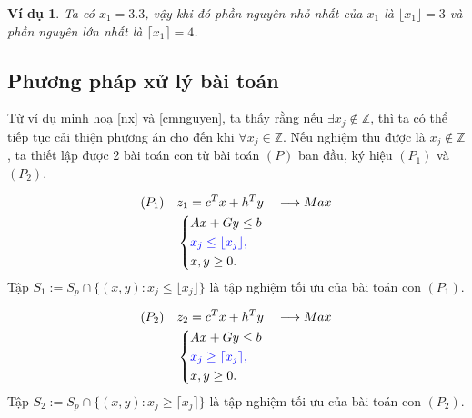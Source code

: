 \documentclass[12pt,a4paper]{report}
\newtheorem{vd}{Ví dụ}
\begin{document}
\begin{vd}
Ta có $x_1=3.3$, vậy khi đó phần nguyên nhỏ nhất của $x_1$ là $\lfloor x_1 \rfloor = 3$ và phần nguyên lớn nhất là $\lceil x_1 \rceil =4$.
\end{vd}

\subsection*{Phương pháp xử lý bài toán}

Từ ví dụ minh hoạ \eqref{nx} và \eqref{cmnguyen}, ta thấy rằng nếu $\exists x_j \notin \mathbb{Z}$, thì ta có thể tiếp tục cải thiện phương án cho đến khi $\forall x_j \in \mathbb{Z}$. 
Nếu nghiệm thu được là $x_j \notin \mathbb{Z}$, ta thiết lập được 2 bài toán con từ bài toán $(P)$ ban đầu, ký hiệu $(P_1)$ và $(P_2)$.

\begin{equation}
    \begin{split}
    (P_1) \quad & z_1=c^Tx+h^Ty \quad \longrightarrow Max \\
                & \left\{\begin{split}
                    &Ax+Gy \leq  b \\
                    &\color{blue} x_j \leq \lfloor x_j \rfloor , \\
                    &x,y \geq 0.
                \end{split}\right.    
    \end{split}
\end{equation}
Tập $S_1:=S_p \cap \{ (x,y): x_j \leq \lfloor x_j \rfloor \}$ là tập nghiệm tối ưu của bài toán con $(P_1)$.



\begin{equation}
    \begin{split}
    (P_2) \quad & z_2=c^Tx+h^Ty \quad \longrightarrow Max \\
                & \left\{\begin{split}
                    &Ax+Gy \leq  b \\
                    &\color{blue} x_j \geq \lceil x_j \rceil , \\
                    &x,y \geq 0.
                \end{split}\right.    
    \end{split}
\end{equation}
Tập $S_2:=S_p \cap \{ (x,y): x_j \geq \lceil x_j \rceil \}$ là tập nghiệm tối ưu của bài toán con $(P_2)$.
\end{document}
